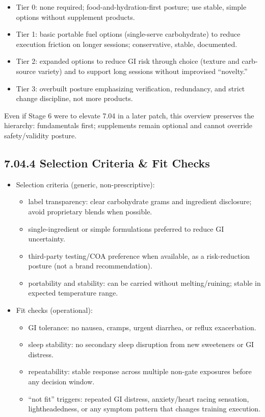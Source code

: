 \documentclass[10pt]{article}
\begin{document}
\begin{itemize}
\item Tier 0: none required; food-and-hydration-first posture; use stable, simple options without supplement products.
\item Tier 1: basic portable fuel options (single-serve carbohydrate) to reduce execution friction on longer sessions; conservative, stable, documented.
\item Tier 2: expanded options to reduce GI risk through choice (texture and carb-source variety) and to support long sessions without improvised “novelty.”
\item Tier 3: overbuilt posture emphasizing verification, redundancy, and strict change discipline, not more products.
\end{itemize}

Even if Stage 6 were to elevate 7.04 in a later patch, this overview preserves the hierarchy: fundamentals first; supplements remain optional and cannot override safety/validity posture.

\subsection*{7.04.4 Selection Criteria \& Fit Checks}
{}

\begin{itemize}
\item Selection criteria (generic, non-prescriptive):
  \begin{itemize}
  \item label transparency: clear carbohydrate grams and ingredient disclosure; avoid proprietary blends when possible.
  \item single-ingredient or simple formulations preferred to reduce GI uncertainty.
  \item third-party testing/COA preference when available, as a risk-reduction posture (not a brand recommendation).
  \item portability and stability: can be carried without melting/ruining; stable in expected temperature range.
  \end{itemize}
\item Fit checks (operational):
  \begin{itemize}
  \item GI tolerance: no nausea, cramps, urgent diarrhea, or reflux exacerbation.
  \item sleep stability: no secondary sleep disruption from new sweeteners or GI distress.
  \item repeatability: stable response across multiple non-gate exposures before any decision window.
  \item “not fit” triggers: repeated GI distress, anxiety/heart racing sensation, lightheadedness, or any symptom pattern that changes training execution.
  \end{itemize}
\end{itemize}
\end{document}
